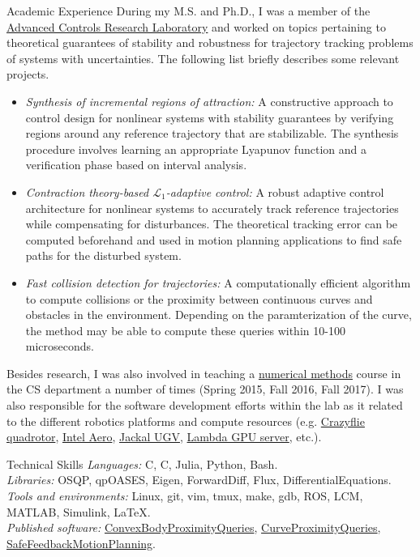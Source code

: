 \documentclass[9pt]{article}
\newcommand \CPP {{C\nolinebreak[4]\hspace{-.05em}\raisebox{.4ex}{\tiny\bf ++}}}
\begin{document}
\begin{rsection}{Academic Experience}
    During my M.S. and Ph.D., I was a member of the \href{https://naira.mechse.illinois.edu}{Advanced Controls Research Laboratory} and worked on topics pertaining to theoretical guarantees of stability and robustness for trajectory tracking problems of systems with uncertainties. The following list briefly describes some relevant projects.
    \begin{itemize}
        \item \textit{Synthesis of incremental regions of attraction:} A constructive approach to control design for nonlinear systems with stability guarantees by verifying regions around any reference trajectory that are stabilizable. The synthesis procedure involves learning an appropriate Lyapunov function and a verification phase based on interval analysis.
        \item \textit{Contraction theory-based $\mathcal{L}_1$-adaptive control:}  A robust adaptive control architecture for nonlinear systems to accurately track reference trajectories while compensating for disturbances. The theoretical tracking error can be computed beforehand and used in motion planning applications to find safe paths for the disturbed system.
        \item \textit{Fast collision detection for trajectories:} A computationally efficient algorithm to compute collisions or the proximity between continuous curves and obstacles in the environment. Depending on the paramterization of the curve, the method may be able to compute these queries within 10-100 microseconds.
    \end{itemize}
    Besides research, I was also involved in teaching a \href{https://courses.engr.illinois.edu/cs357/fa2021/}{numerical methods} course in the CS department a number of times (Spring 2015, Fall 2016, Fall 2017). I was also responsible for the software development efforts within the lab as it related to the different robotics platforms and compute resources (e.g. \href{https://www.bitcraze.io/}{Crazyflie quadrotor}, \href{https://docs.px4.io/master/en/complete_vehicles/intel_aero.html}{Intel Aero}, \href{https://clearpathrobotics.com/jackal-small-unmanned-ground-vehicle/}{Jackal UGV}, \href{https://lambdalabs.com/products/blade}{Lambda GPU server}, etc.). 
\end{rsection}

\begin{rsection}{Technical Skills}
    \textit{Languages:} C, \CPP, Julia, Python, Bash. \\
    \textit{Libraries:} OSQP, qpOASES, Eigen, ForwardDiff, Flux, DifferentialEquations. \\
    \textit{Tools and environments:} Linux, git, vim, tmux, make, gdb, ROS, LCM, MATLAB, Simulink, \LaTeX. \\
    \textit{Published software:} \href{https://github.com/arlk/ConvexBodyProximityQueries.jl}{ConvexBodyProximityQueries}, \href{https://github.com/arlk/CurveProximityQueries.jl}{CurveProximityQueries}, \href{https://github.com/arlk/SafeFeedbackMotionPlanning.jl}{SafeFeedbackMotionPlanning}.
\end{rsection}
\end{document}
